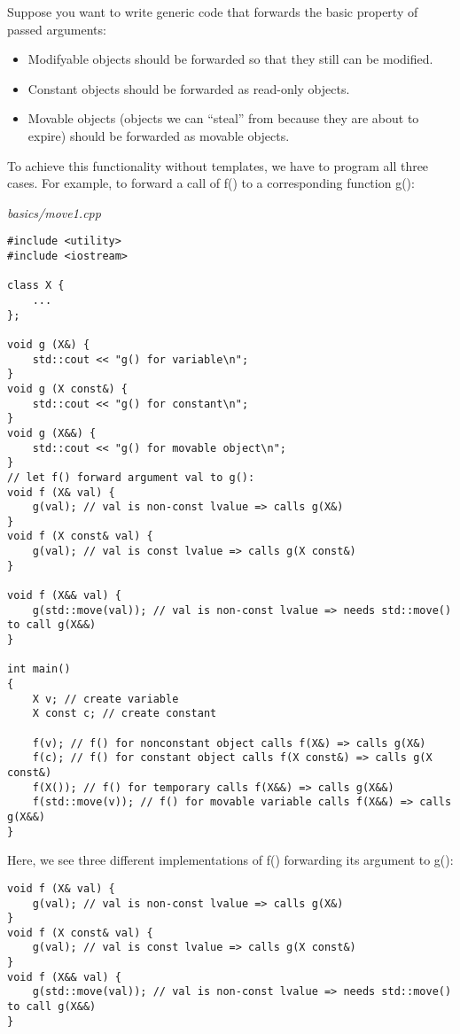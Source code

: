 Suppose you want to write generic code that forwards the basic property of passed arguments:

\begin{itemize}
\item 
Modifyable objects should be forwarded so that they still can be modified.

\item 
Constant objects should be forwarded as read-only objects.

\item 
Movable objects (objects we can “steal” from because they are about to expire) should be forwarded as movable objects.
\end{itemize}

To achieve this functionality without templates, we have to program all three cases. For example, to forward a call of f() to a corresponding function g():

\noindent
\textit{basics/move1.cpp}
\begin{lstlisting}[style=styleCXX]
#include <utility>
#include <iostream>

class X {
	...
};

void g (X&) {
	std::cout << "g() for variable\n";
}
void g (X const&) {
	std::cout << "g() for constant\n";
}
void g (X&&) {
	std::cout << "g() for movable object\n";
}
// let f() forward argument val to g():
void f (X& val) {
	g(val); // val is non-const lvalue => calls g(X&)
}
void f (X const& val) {
	g(val); // val is const lvalue => calls g(X const&)
}

void f (X&& val) {
	g(std::move(val)); // val is non-const lvalue => needs std::move() to call g(X&&)
}

int main()
{
	X v; // create variable
	X const c; // create constant
	
	f(v); // f() for nonconstant object calls f(X&) => calls g(X&)
	f(c); // f() for constant object calls f(X const&) => calls g(X const&)
	f(X()); // f() for temporary calls f(X&&) => calls g(X&&)
	f(std::move(v)); // f() for movable variable calls f(X&&) => calls g(X&&)
}
\end{lstlisting}

Here, we see three different implementations of f() forwarding its argument to g():

\begin{lstlisting}[style=styleCXX]
void f (X& val) {
	g(val); // val is non-const lvalue => calls g(X&)
}
void f (X const& val) {
	g(val); // val is const lvalue => calls g(X const&)
}
void f (X&& val) {
	g(std::move(val)); // val is non-const lvalue => needs std::move() to call g(X&&)
}
\end{lstlisting}

